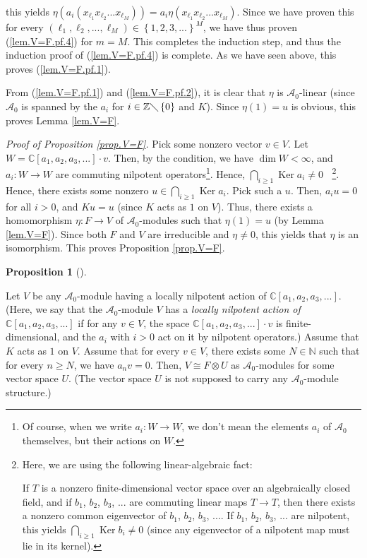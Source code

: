 \documentclass
[numbers=enddot,12pt,final,onecolumn,german,notitlepage]{scrartcl}%
\theoremstyle{definition}
\newtheorem{prop}[theo]{Proposition}
\newenvironment{proposition}[1][]
{\begin{prop}[#1]\begin{leftbar}}
{\end{leftbar}\end{prop}}
\begin{document}
this yields $\eta\left(  a_{i}\left(  x_{\ell_{1}}x_{\ell_{2}}...x_{\ell_{M}%
}\right)  \right)  =a_{i}\eta\left(  x_{\ell_{1}}x_{\ell_{2}}...x_{\ell_{M}%
}\right)  $. Since we have proven this for every $\left(  \ell_{1},\ell
_{2},...,\ell_{M}\right)  \in\left\{  1,2,3,...\right\}  ^{M}$, we have thus
proven (\ref{lem.V=F.pf.4}) for $m=M$. This completes the induction step, and
thus the induction proof of (\ref{lem.V=F.pf.4}) is complete. As we have seen
above, this proves (\ref{lem.V=F.pf.1}).

From (\ref{lem.V=F.pf.1}) and (\ref{lem.V=F.pf.2}), it is clear that $\eta$ is
$\mathcal{A}_{0}$-linear (since $\mathcal{A}_{0}$ is spanned by the $a_{i}$
for $i\in\mathbb{Z}\diagdown\left\{  0\right\}  $ and $K$). Since $\eta\left(
1\right)  =u$ is obvious, this proves Lemma \ref{lem.V=F}.

\textit{Proof of Proposition \ref{prop.V=F}.} Pick some nonzero vector $v\in
V$. Let $W=\mathbb{C}\left[  a_{1},a_{2},a_{3},...\right]  \cdot v$. Then, by
the condition, we have $\dim W<\infty$, and $a_{i}:W\rightarrow W$ are
commuting nilpotent operators\footnote{Of course, when we write $a_{i}%
:W\rightarrow W$, we don't mean the elements $a_{i}$ of $\mathcal{A}_{0}$
themselves, but their actions on $W$.}. Hence, $\bigcap\limits_{i\geq
1}\operatorname*{Ker}a_{i}\neq0\ \ \ \ $\footnote{Here, we are using the
following linear-algebraic fact:
\par
If $T$ is a nonzero finite-dimensional vector space over an algebraically
closed field, and if $b_{1}$, $b_{2}$, $b_{3}$, $...$ are commuting linear
maps $T\rightarrow T$, then there exists a nonzero common eigenvector of
$b_{1}$, $b_{2}$, $b_{3}$, $...$. If $b_{1}$, $b_{2}$, $b_{3}$, $...$ are
nilpotent, this yields $\bigcap\limits_{i\geq1}\operatorname*{Ker}b_{i}\neq0$
(since any eigenvector of a nilpotent map must lie in its kernel).}. Hence,
there exists some nonzero $u\in\bigcap\limits_{i\geq1}\operatorname*{Ker}%
a_{i}$. Pick such a $u$. Then, $a_{i}u=0$ for all $i>0$, and $Ku=u$ (since $K$
acts as $1$ on $V$). Thus, there exists a homomorphism $\eta:F\rightarrow V$
of $\mathcal{A}_{0}$-modules such that $\eta\left(  1\right)  =u$ (by Lemma
\ref{lem.V=F}). Since both $F$ and $V$ are irreducible and $\eta\neq0$, this
yields that $\eta$ is an isomorphism. This proves Proposition \ref{prop.V=F}.

\begin{proposition}
\label{prop.V=F(X)U}Let $V$ be any $\mathcal{A}_{0}$-module having a locally
nilpotent action of $\mathbb{C}\left[  a_{1},a_{2},a_{3},...\right]  $. (Here,
we say that the $\mathcal{A}_{0}$-module $V$ has a \textit{locally nilpotent
action of$\mathbb{\ }$}$\mathbb{C}\left[  a_{1},a_{2},a_{3},...\right]  $ if
for any $v\in V$, the space $\mathbb{C}\left[  a_{1},a_{2},a_{3},...\right]
\cdot v$ is finite-dimensional, and the $a_{i}$ with $i>0$ act on it by
nilpotent operators.) Assume that $K$ acts as $1$ on $V$. Assume that for
every $v\in V$, there exists some $N\in\mathbb{N}$ such that for every $n\geq
N$, we have $a_{n}v=0$. Then, $V\cong F\otimes U$ as $\mathcal{A}_{0}$-modules
for some vector space $U$. (The vector space $U$ is not supposed to carry any
$\mathcal{A}_{0}$-module structure.)
\end{proposition}
\end{document}
